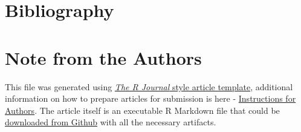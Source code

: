 \hypertarget{bibliography}{%
\section{Bibliography}\label{bibliography}}

\newpage

\hypertarget{note-from-the-authors}{%
\section{Note from the Authors}\label{note-from-the-authors}}

This file was generated using
\href{https://github.com/rstudio/rticles}{\emph{The R Journal} style
article template}, additional information on how to prepare articles for
submission is here -
\href{https://journal.r-project.org/share/author-guide.pdf}{Instructions
for Authors}. The article itself is an executable R Markdown file that
could be
\href{https://github.com/ivbsoftware/big-data-final-2/blob/master/docs/R_Journal/big-data-final-2/}{downloaded
from Github} with all the necessary artifacts.


\address{%
Sumaira Afzal\\
York University School of Continuing Studies\\
\\
}


\address{%
Viraja Ketkar\\
York University School of Continuing Studies\\
\\
}


\address{%
Murlidhar Loka\\
York University School of Continuing Studies\\
\\
}


\address{%
Vadim Spirkov\\
York University School of Continuing Studies\\
\\
}


